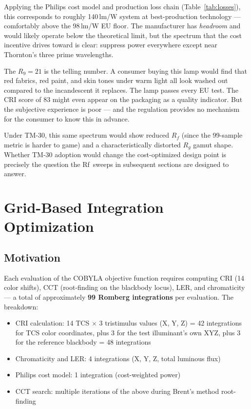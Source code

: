 \documentclass[11pt]{article}
\begin{document}
\noindent Applying the Philips cost model and production loss chain
(Table~\ref{tab:losses}), this corresponds to roughly 140\,lm/W
system at best-production technology --- comfortably above the
98\,lm/W EU floor.  The manufacturer has \emph{headroom} and would
likely operate below the theoretical limit, but the spectrum that
the cost incentive drives toward is clear: suppress power everywhere
except near Thornton's three prime wavelengths.

The $R_9 = 21$ is the telling number.  A consumer buying this lamp would
find that red fabrics, red paint, and skin tones under warm light all look
washed out compared to the incandescent it replaces.  The lamp passes every
EU test.  The CRI score of 83 might even appear on the packaging as a
quality indicator.  But the subjective experience is poor --- and the
regulation provides no mechanism for the consumer to know this in advance.

Under TM-30, this same spectrum would show reduced $R_f$ (since the
99-sample metric is harder to game) and a characteristically distorted
$R_g$ gamut shape.  Whether TM-30 adoption would change the cost-optimized
design point is precisely the question the Rf~sweeps in subsequent sections
are designed to answer.

\section{Grid-Based Integration Optimization}
\label{sec:grid}

\subsection{Motivation}

Each evaluation of the COBYLA objective function requires computing
CRI (14 color shifts), CCT (root-finding on the blackbody locus), LER,
and chromaticity --- a total of approximately \textbf{99 Romberg
integrations} per evaluation.  The breakdown:

\begin{itemize}
\item CRI calculation: 14 TCS $\times$ 3 tristimulus values (X, Y, Z)
  = 42 integrations for TCS color coordinates, plus 3 for the test
  illuminant's own XYZ, plus 3 for the reference blackbody = 48
  integrations
\item Chromaticity and LER: 4 integrations (X, Y, Z, total luminous flux)
\item Philips cost model: 1 integration (cost-weighted power)
\item CCT search: multiple iterations of the above during Brent's method
  root-finding
\end{itemize}
\end{document}
